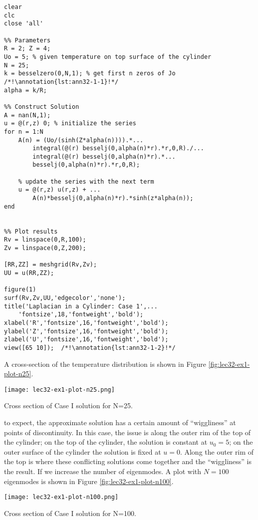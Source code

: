 \begin{lstlisting}[name=lec32-ex1, style=myMatlab]
clear
clc
close 'all'

%% Parameters
R = 2; Z = 4;
Uo = 5; % given temperature on top surface of the cylinder
N = 25;
k = besselzero(0,N,1); % get first n zeros of Jo    /*!\annotation{lst:ann32-1-1}!*/
alpha = k/R;

%% Construct Solution
A = nan(N,1);
u = @(r,z) 0; % initialize the series
for n = 1:N
    A(n) = (Uo/(sinh(Z*alpha(n)))).*...
        integral(@(r) besselj(0,alpha(n)*r).*r,0,R)./...
        integral(@(r) besselj(0,alpha(n)*r).*...
        besselj(0,alpha(n)*r).*r,0,R);
    
    % update the series with the next term
    u = @(r,z) u(r,z) + ...
        A(n)*besselj(0,alpha(n)*r).*sinh(z*alpha(n));    
end


%% Plot results
Rv = linspace(0,R,100);
Zv = linspace(0,Z,200);

[RR,ZZ] = meshgrid(Rv,Zv);
UU = u(RR,ZZ);

figure(1)
surf(Rv,Zv,UU,'edgecolor','none');
title('Laplacian in a Cylinder: Case 1',...
    'fontsize',18,'fontweight','bold');
xlabel('R','fontsize',16,'fontweight','bold');
ylabel('Z','fontsize',16,'fontweight','bold');
zlabel('U','fontsize',16,'fontweight','bold');
view([65 10]);  /*!\annotation{lst:ann32-1-2}!*/
\end{lstlisting}
A cross-section of the temperature distribution is shown in Figure \ref{fig:lec32-ex1-plot-n25}. 
\begin{marginfigure}
\texttt{[image: lec32-ex1-plot-n25.png]}
\caption{Cross section of Case I solution for N=25.}
\label{fig:lec32-ex1-plot-n25}
\end{marginfigure}
 to expect, the approximate solution has a certain amount of ``wiggliness'' at points of discontinuity.  In this case, the issue is along the outer rim of the top of the cylinder; on the top of the cylinder, the solution is constant at $u_0 = 5$; on the outer surface of the cylinder the solution is fixed at $u = 0$.  Along the outer rim of the top is where these conflicting solutions come together and the ``wiggliness'' is the result.  If we increase the number of eigenmodes.  A plot with $N=100$ eigenmodes is shown in Figure \ref{fig:lec32-ex1-plot-n100}.
\begin{marginfigure}
\texttt{[image: lec32-ex1-plot-n100.png]}
\caption{Cross section of Case I solution for N=100.}
\label{fig:lec32-ex1-plot-n100}
\end{marginfigure}

